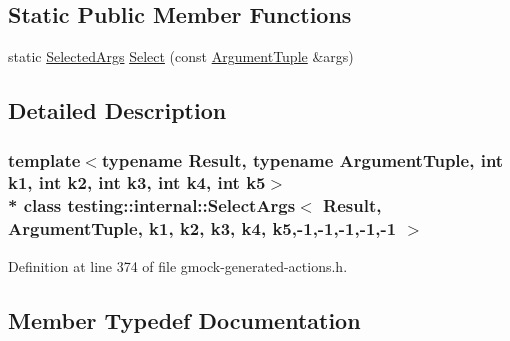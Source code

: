 \subsection*{Static Public Member Functions}
\begin{DoxyCompactItemize}
\item 
static \hyperlink{classtesting_1_1internal_1_1_select_args_3_01_result_00_01_argument_tuple_00_01k1_00_01k2_00_01k6e7fa8d2e210d646d72ee410b10aa03c_a96d3b235ab6a72004f4fe2492a3ddd66}{Selected\+Args} \hyperlink{classtesting_1_1internal_1_1_select_args_3_01_result_00_01_argument_tuple_00_01k1_00_01k2_00_01k6e7fa8d2e210d646d72ee410b10aa03c_a154410b3b018654effefc81b33a3ee82}{Select} (const \hyperlink{typedefs__d_8js_a396b2bdc7ef45f482a7e9254b15c3c01}{Argument\+Tuple} \&args)
\end{DoxyCompactItemize}


\subsection{Detailed Description}
\subsubsection*{template$<$typename Result, typename Argument\+Tuple, int k1, int k2, int k3, int k4, int k5$>$\\*
class testing\+::internal\+::\+Select\+Args$<$ Result, Argument\+Tuple, k1, k2, k3, k4, k5,-\/1,-\/1,-\/1,-\/1,-\/1 $>$}



Definition at line 374 of file gmock-\/generated-\/actions.\+h.



\subsection{Member Typedef Documentation}
